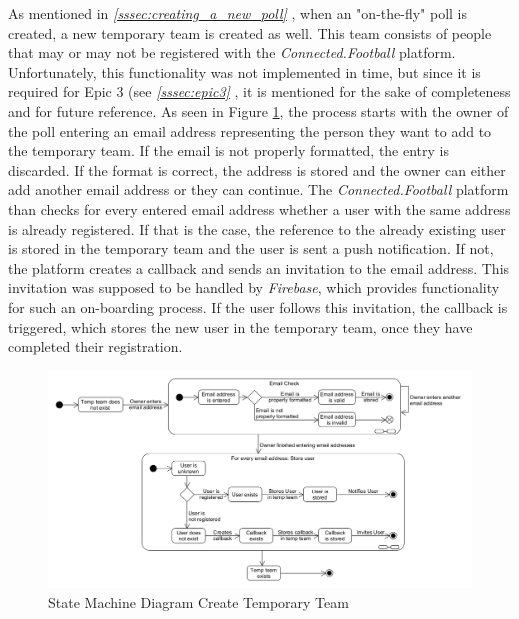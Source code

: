 As mentioned in \textit{\ref{sssec:creating_a_new_poll} }, when an "on-the-fly" poll is created, a new temporary team is created as well. This team consists of people that may or may not be registered with the \textit{Connected.Football} platform. Unfortunately, this functionality was not implemented in time, but since it is required for Epic 3 (see \textit{\ref{sssec:epic3} }, it is mentioned for the sake of completeness and for future reference.
\newline
As seen in Figure \ref{fig:state_machine_diagram_create_temp_team}, the process starts with the owner of the poll entering an email address representing the person they want to add to the temporary team. If the email is not properly formatted, the entry is discarded. If the format is correct, the address is stored and the owner can either add another email address or they can continue.
\newline
The \textit{Connected.Football} platform than checks for every entered email address whether a user with the same address is already registered. If that is the case, the reference to the already existing user is stored in the temporary team and the user is sent a push notification. If not, the platform creates a callback and sends an invitation to the email address. This invitation was supposed to be handled by \textit{Firebase}, which provides functionality for such an on-boarding process. If the user follows this invitation, the callback is triggered, which stores the new user in the temporary team, once they have completed their registration.

\begin{figure}[H]
    \begin{center}
        \includegraphics[width=1\textwidth]{images/diagrams/state_machine_diagrams/StateDiagram_CreateTempTeam.png}
        \caption{State Machine Diagram Create Temporary Team}
        \label{fig:state_machine_diagram_create_temp_team}
    \end{center}
\end{figure}


